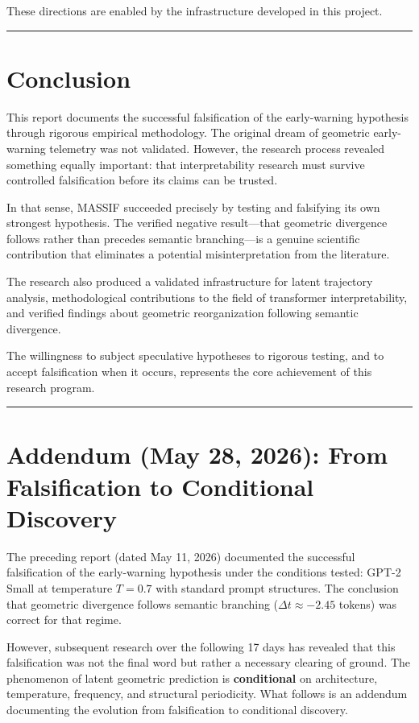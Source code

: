 \documentclass[12pt,a4paper]{article}
\begin{document}
These directions are enabled by the infrastructure developed in this project.

\medskip
\hrule
\medskip

\section{Conclusion}

This report documents the successful falsification of the early-warning hypothesis through rigorous empirical methodology. The original dream of geometric early-warning telemetry was not validated. However, the research process revealed something equally important: that interpretability research must survive controlled falsification before its claims can be trusted.

In that sense, MASSIF succeeded precisely by testing and falsifying its own strongest hypothesis. The verified negative result---that geometric divergence follows rather than precedes semantic branching---is a genuine scientific contribution that eliminates a potential misinterpretation from the literature.

The research also produced a validated infrastructure for latent trajectory analysis, methodological contributions to the field of transformer interpretability, and verified findings about geometric reorganization following semantic divergence.

The willingness to subject speculative hypotheses to rigorous testing, and to accept falsification when it occurs, represents the core achievement of this research program.

\medskip
\hrule
\medskip

\section{Addendum (May 28, 2026): From Falsification to Conditional Discovery}

The preceding report (dated May 11, 2026) documented the successful falsification of the early-warning hypothesis under the conditions tested: GPT-2 Small at temperature $T=0.7$ with standard prompt structures. The conclusion that geometric divergence follows semantic branching ($\Delta t \approx -2.45$ tokens) was correct for that regime.

However, subsequent research over the following 17 days has revealed that this falsification was not the final word but rather a necessary clearing of ground. The phenomenon of latent geometric prediction is \textbf{conditional} on architecture, temperature, frequency, and structural periodicity. What follows is an addendum documenting the evolution from falsification to conditional discovery.
\end{document}

